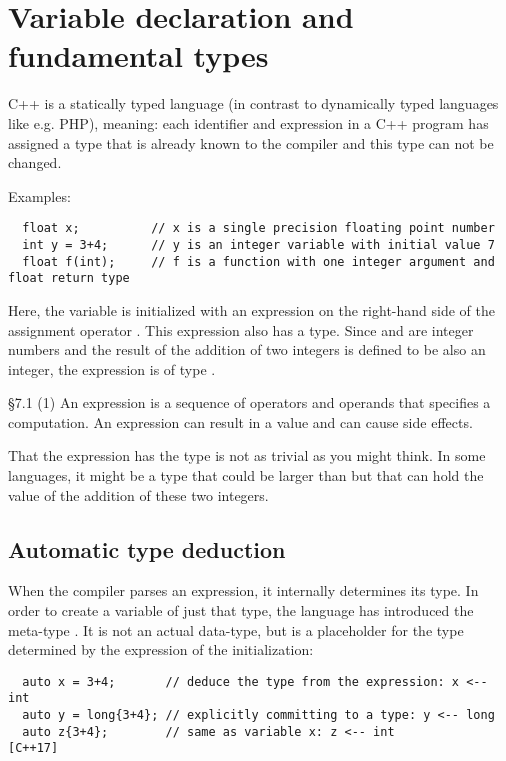 \section{Variable declaration and fundamental types\label{sec:data-type}}
C++ is a statically typed language (in contrast to dynamically typed languages like e.g. PHP), meaning: each identifier and expression in a
C++ program has assigned a type that is already known to the compiler and this type can not be changed.

Examples:
\begin{verbatim}
  float x;          // x is a single precision floating point number
  int y = 3+4;      // y is an integer variable with initial value 7
  float f(int);     // f is a function with one integer argument and float return type
\end{verbatim}

Here, the variable  is initialized with an expression on the right-hand side of the assignment operator \cpp{=}. This
expression  also has a type. Since  and  are integer numbers and the result of the addition of two integers is
defined to be also an integer, the expression is of type .

\begin{standard}{\S 7.1 (1)}
  An expression is a sequence of operators and operands that specifies a computation. An expression can result in a value and can cause side effects.
\end{standard}

\begin{rem}
  That the expression  has the type  is not as trivial as you might think. In some languages, it might be a type that could be
  larger than  but that can hold the value of the addition of these two integers.
\end{rem}


\subsection{Automatic type deduction}
When the compiler parses an expression, it internally determines its type. In order to create a variable of just that type, the language has
introduced the meta-type . It is not an actual data-type, but is a placeholder for the type determined by the expression of the
initialization:
\begin{verbatim}
  auto x = 3+4;       // deduce the type from the expression: x <-- int
  auto y = long{3+4}; // explicitly committing to a type: y <-- long
  auto z{3+4};        // same as variable x: z <-- int                  [C++17]
\end{verbatim}

